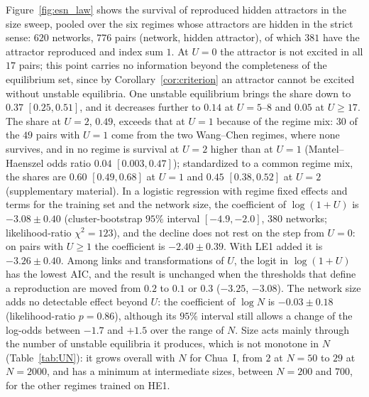 \documentclass[aip,cha,reprint,amsmath,amssymb,longbibliography]{revtex4-2}
\theoremstyle{definition}
\begin{document}
Figure~\ref{fig:esn_law} shows the survival of reproduced hidden attractors in the size sweep, pooled over the six regimes
whose attractors are hidden in the strict sense: $620$ networks, $776$ pairs (network, hidden attractor), of which $381$ have
the attractor reproduced and index sum $1$. At $U=0$ the attractor is not excited in all $17$ pairs; this point carries no
information beyond the completeness of the equilibrium set, since by Corollary~\ref{cor:criterion} an attractor cannot be
excited without unstable equilibria. One unstable equilibrium brings the share down to $0.37$ $[0.25, 0.51]$, and it
decreases further to $0.14$ at $U=5$--$8$ and $0.05$ at $U\ge17$. The share at $U=2$, $0.49$, exceeds that at $U=1$ because
of the regime mix: $30$ of the $49$ pairs with $U=1$ come from the two Wang--Chen regimes, where none survives, and in no
regime is survival at $U=2$ higher than at $U=1$ (Mantel--Haenszel odds ratio $0.04$ $[0.003, 0.47]$); standardized to
a common regime mix, the shares are $0.60$ $[0.49,0.68]$ at $U=1$ and $0.45$ $[0.38,0.52]$ at $U=2$ (supplementary
material). In a logistic regression with regime fixed effects and terms for the training set and the network size, the
coefficient of $\log(1+U)$ is $-3.08\pm0.40$ (cluster-bootstrap $95\%$ interval $[-4.9,-2.0]$, $380$ networks;
likelihood-ratio $\chi^2=123$), and the decline does not rest on the step from $U=0$: on pairs with $U\ge1$ the coefficient
is $-2.40\pm0.39$. With LE1 added it is $-3.26\pm0.40$. Among links and transformations of $U$, the logit in $\log(1+U)$
has the lowest AIC, and the result is unchanged when the thresholds that define a reproduction are moved from $0.2$ to
$0.1$ or $0.3$ ($-3.25$, $-3.08$). The
network size adds no detectable effect beyond $U$: the coefficient of $\log N$ is $-0.03\pm0.18$ (likelihood-ratio
$p=0.86$), although its $95\%$ interval still allows a change of the log-odds between $-1.7$ and $+1.5$ over the range of
$N$. Size acts mainly through the number of unstable equilibria it produces, which is not monotone in $N$
(Table~\ref{tab:UN}): it grows overall with $N$ for Chua~I, from $2$ at $N=50$ to $29$ at $N=2000$, and has a minimum at
intermediate sizes, between $N=200$ and $700$, for the other regimes trained on HE1.
\end{document}
